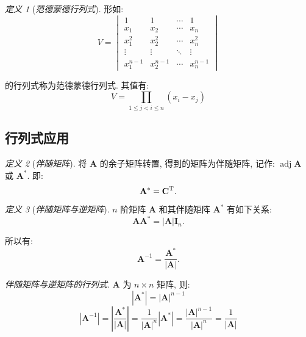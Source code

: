 \documentclass[UTF8]{ctexart}
\theoremstyle{remark}
\newtheorem{Definition}{\hspace{1em} 定义}[subsection]
\newenvironment{definition}[1]
{\begin{Definition}[#1] \hspace{0.5em}}
{\end{Definition} \vspace{0.5em}}
\newenvironment{concept}[1]
{\hspace{1em} #1. \hspace{0.5em}}
{\vspace{0.5em}}
\newcommand{\mb}{\mathbf}
\begin{document}
\begin{framed}
    \begin{definition}{\textit{范德蒙德行列式}}
        形如:
        \[ 
            V = \begin{vmatrix}
                1 & 1 & \cdots & 1 \\
                x_1 & x_2 & \cdots & x_n \\
                x_1^2 & x_2^2 & \cdots & x_n^2 \\ 
                \vdots & \vdots & \ddots & \vdots \\
                x_1^{n-1} & x_2^{n-1} & \cdots & x_n^{n-1}
            \end{vmatrix}
        \]
        
        的行列式称为范德蒙德行列式. 其值有:
        \[ V = \prod_{1 \leqslant j < i \leqslant n} (x_i - x_j) \]

    \end{definition}
\end{framed}




\subsection{行列式应用}
\begin{framed}
    \begin{definition}{\textit{伴随矩阵}}
        将 $ \mb A $ 的余子矩阵转置, 得到的矩阵为伴随矩阵, 记作: $ \operatorname{adj} \mb A $ 或 $ \mb A^* $. 即:
        \[ \mb A^* = \mb C^{\rm T} .\]
    \end{definition}
\end{framed}


\begin{framed}
    \begin{definition}{\textit{伴随矩阵与逆矩阵}}
        $ n $ 阶矩阵 $ \mb A $ 和其伴随矩阵 $ \mb A^* $ 有如下关系:
        \[ \mb A \mb A^* = |\mb A|\mb I_n .\]

        所以有:
        \[ \mb A^{-1} = \dfrac{\mb A^*}{|\mb A|} .\]
    \end{definition}
\end{framed}


\begin{framed}
    \begin{concept}{\textit{伴随矩阵与逆矩阵的行列式}}
    $ \mb A $ 为 $ n \times n $ 矩阵, 则:
    \[ |\mb A^*| = |\mb A|^{n - 1} \]
    \[ |\mb A^{-1}| = \left| \dfrac{\mb A^*}{|\mb A|} \right| = \dfrac{1}{|\mb A|^n} |\mb A^*| = \dfrac{|\mb A|^{n - 1}}{|\mb A|^n} = \dfrac{1}{|\mb A|} \]
    \end{concept}
\end{framed}
\end{document}
